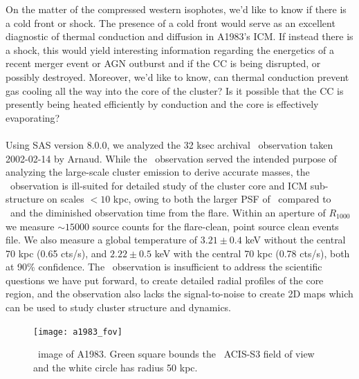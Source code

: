 \documentclass[letterpaper,11pt,twocolumn]{article}
\begin{document}
On the matter of the compressed western isophotes, we'd like to know
if there is a cold front or shock. The presence of a cold front would
serve as an excellent diagnostic of thermal conduction and diffusion
in A1983's ICM. If instead there is a shock, this would yield
interesting information regarding the energetics of a recent merger
event or AGN outburst and if the CC is being disrupted, or possibly
destroyed. Moreover, we'd like to know, can thermal conduction prevent
gas cooling all the way into the core of the cluster?  Is it possible
that the CC is presently being heated efficiently by conduction and
the core is effectively evaporating?\\

\\
Using SAS version 8.0.0, we analyzed the 32 ksec archival
\xmm\ observation taken 2002-02-14 by Arnaud. While the
\xmm\ observation served the intended purpose of analyzing the
large-scale cluster emission to derive accurate masses, the
\xmm\ observation is ill-suited for detailed study of the cluster core
and ICM sub-structure on scales $< 10$ kpc, owing to both the larger
PSF of \xmm\ compared to \chandra\ and the diminished observation time
from the flare. Within an aperture of $R_{1000}$ we measure $\sim
15000$ source counts for the flare-clean, point source clean events
file. We also measure a global temperature of $3.21 \pm 0.4$ keV
without the central 70 kpc (0.65 cts/s), and $2.22 \pm 0.5$ keV with
the central 70 kpc (0.78 cts/s), both at 90\% confidence. The
\xmm\ observation is insufficient to address the scientific questions
we have put forward, to create detailed radial profiles of the core
region, and the observation also lacks the signal-to-noise to create
2D maps which can be used to study cluster structure and dynamics.
\begin{figure}[htp]
  \texttt{[image: a1983\_fov]}
  \caption{\xmm\ image of A1983. Green square bounds the
    \chandra\ ACIS-S3 field of view and the white circle has radius 50
    kpc.}
  \label{fig:a1983}
\end{figure}\\
\end{document}
